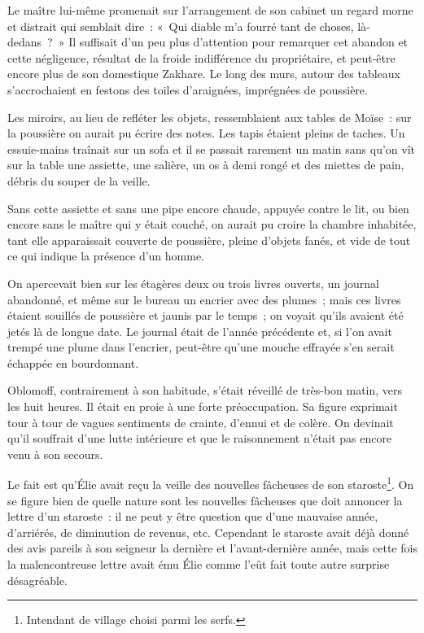 \documentclass[french,twoside]{book} %
\begin{document}
Le maître lui-même promenait sur l’arrangement de son cabinet un regard morne et distrait qui semblait dire : « Qui diable m’a fourré tant de choses, là-dedans ? » Il suffisait d’un peu plus d’attention pour remarquer cet abandon et cette négligence, résultat de la froide indifférence du propriétaire, et peut-être encore plus de son domestique Zakhare. Le long des murs, autour des tableaux s’accrochaient en festons des toiles d’araignées, imprégnées de poussière.\par
Les miroirs, au lieu de refléter les objets, ressemblaient aux tables de Moïse : sur la poussière on aurait pu écrire des notes. Les tapis étaient pleins de taches. Un essuie-mains traînait sur un sofa et il se passait rarement un matin sans qu’on vît sur la table une assiette, une salière, un os à demi rongé et des miettes de pain, débris du souper de la veille.\par
Sans cette assiette et sans une pipe encore chaude, appuyée contre le lit, ou bien encore sans le maître qui y était couché, on aurait pu croire la chambre inhabitée, tant elle apparaissait couverte de poussière, pleine d’objets fanés, et vide de tout ce qui indique la présence d’un homme.\par
On apercevait bien sur les étagères deux ou trois livres ouverts, un journal abandonné, et même sur le bureau un encrier avec des plumes ; mais ces livres étaient souillés de poussière et jaunis par le temps ; on voyait qu’ils avaient été jetés là de longue date. Le journal était de l’année précédente et, si l’on avait trempé une plume dans l’encrier, peut-être qu’une mouche effrayée s’en serait échappée en bourdonnant.\par
Oblomoff, contrairement à son habitude, s’était réveillé de très-bon matin, vers les huit heures. Il était en proie à une forte préoccupation. Sa figure exprimait tour à tour de vagues sentiments de crainte, d’ennui et de colère. On devinait qu’il souffrait d’une lutte intérieure et que le raisonnement n’était pas encore venu à son secours.\par
Le fait est qu’Élie avait reçu la veille des nouvelles fâcheuses de son staroste\footnote{Intendant de village choisi parmi les serfs.}. On se figure bien de quelle nature sont les nouvelles fâcheuses que doit annoncer la lettre d’un staroste : il ne peut y être question que d’une mauvaise année, d’arriérés, de diminution de revenus, etc. Cependant le staroste avait déjà donné des avis pareils à son seigneur la dernière et l’avant-dernière année, mais cette fois la malencontreuse lettre avait ému Élie comme l’eût fait toute autre surprise désagréable.\par
\end{document}
